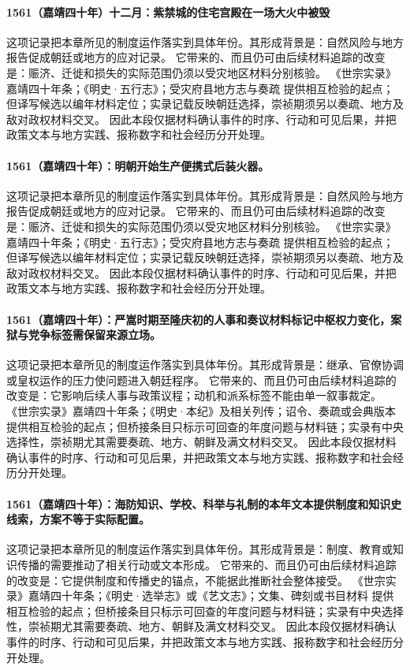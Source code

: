 \paragraph{1561（嘉靖四十年）十二月：紫禁城的住宅宫殿在一场大火中被毁} 这项记录把本章所见的制度运作落实到具体年份。其形成背景是：自然风险与地方报告促成朝廷或地方的应对记录。 它带来的、而且仍可由后续材料追踪的改变是：赈济、迁徙和损失的实际范围仍须以受灾地区材料分别核验。 《世宗实录》嘉靖四十年条；《明史·五行志》；受灾府县地方志与奏疏 提供相互检验的起点；但译写候选以编年材料定位；实录记载反映朝廷选择，崇祯期须另以奏疏、地方及敌对政权材料交叉。 因此本段仅据材料确认事件的时序、行动和可见后果，并把政策文本与地方实践、报称数字和社会经历分开处理。

\paragraph{1561（嘉靖四十年）：明朝开始生产便携式后装火器。} 这项记录把本章所见的制度运作落实到具体年份。其形成背景是：自然风险与地方报告促成朝廷或地方的应对记录。 它带来的、而且仍可由后续材料追踪的改变是：赈济、迁徙和损失的实际范围仍须以受灾地区材料分别核验。 《世宗实录》嘉靖四十年条；《明史·五行志》；受灾府县地方志与奏疏 提供相互检验的起点；但译写候选以编年材料定位；实录记载反映朝廷选择，崇祯期须另以奏疏、地方及敌对政权材料交叉。 因此本段仅据材料确认事件的时序、行动和可见后果，并把政策文本与地方实践、报称数字和社会经历分开处理。

\paragraph{1561（嘉靖四十年）：严嵩时期至隆庆初的人事和奏议材料标记中枢权力变化，案狱与党争标签需保留来源立场。} 这项记录把本章所见的制度运作落实到具体年份。其形成背景是：继承、官僚协调或皇权运作的压力使问题进入朝廷程序。 它带来的、而且仍可由后续材料追踪的改变是：它影响后续人事与政策议程；动机和派系标签不能由单一叙事裁定。 《世宗实录》嘉靖四十年条；《明史·本纪》及相关列传；诏令、奏疏或会典版本 提供相互检验的起点；但桥接条目只标示可回查的年度问题与材料链；实录有中央选择性，崇祯期尤其需要奏疏、地方、朝鲜及满文材料交叉。 因此本段仅据材料确认事件的时序、行动和可见后果，并把政策文本与地方实践、报称数字和社会经历分开处理。

\paragraph{1561（嘉靖四十年）：海防知识、学校、科举与礼制的本年文本提供制度和知识史线索，方案不等于实际配置。} 这项记录把本章所见的制度运作落实到具体年份。其形成背景是：制度、教育或知识传播的需要推动了相关行动或文本形成。 它带来的、而且仍可由后续材料追踪的改变是：它提供制度和传播史的锚点，不能据此推断社会整体接受。 《世宗实录》嘉靖四十年条；《明史·选举志》或《艺文志》；文集、碑刻或书目材料 提供相互检验的起点；但桥接条目只标示可回查的年度问题与材料链；实录有中央选择性，崇祯期尤其需要奏疏、地方、朝鲜及满文材料交叉。 因此本段仅据材料确认事件的时序、行动和可见后果，并把政策文本与地方实践、报称数字和社会经历分开处理。

